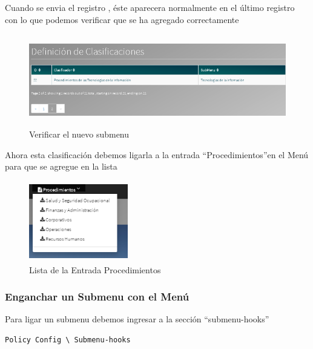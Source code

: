 \documentclass[12pt,letterpaper]{article}
\begin{document}
{\begin{subsection}{\color{blackgreen}}
      \newpage
      Cuando se envia el registro , \'este aparecera normalmente en el \'ultimo registro con lo que podemos verificar que se ha agregado correctamente \\
            \begin{figure}[htb]
              \centering
              \includegraphics[angle=0,width=140mm,height=40mm]{img/Selection_043.png}
              \caption{Verificar el nuevo submenu}
              \label{add_submenu}
            \end{figure}

      Ahora esta clasificaci\'on debemos ligarla a la entrada \textquotedblleft{Procedimientos}\textquotedblright  en el Men\'u para que se agregue en la lista
            \begin{figure}[htb]
              \centering
              \includegraphics[angle=0,width=43mm,height=35mm]{img/Menu_041.png}
              \caption{Lista de la Entrada Procedimientos}
              \label{add_subMenu}
            \end{figure}

      \subsubsection{Enganchar un Submenu con el Men\'u}

      Para ligar un submenu debemos ingresar a la secci\'on \textquotedblleft{submenu-hooks}\textquotedblright

        \begin{lstlisting}[caption=Ruta Ligar,style=customc]
          Policy Config \ Submenu-hooks
        \end{lstlisting}


\end{subsection}}
\end{document}
